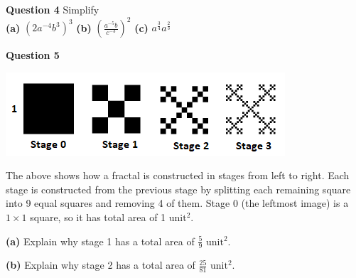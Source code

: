 \documentclass{article}
\begin{document}
{\Large \textbf{Question 4} Simplify \\[6pt]
\textbf{(a)} {\Large $(2a^{-4}b^3)^3$} \hfill \textbf{(b)} {\huge $\left ( \frac{a^{-5}b}{c^{-3}} \right )^2$} \hfill \textbf{(c)} {\huge $a^{\frac{3}{4}}a^{\frac{2}{3}}$}} 

\vspace{0.1cm}
\begin{center}
\end{center}


\pagebreak
{\Large \textbf{Question 5} \\[-6pt]

\begin{center}
\includegraphics{./fractal.png}
\end{center}

The above shows how a fractal is constructed  in stages from left to right. Each stage is constructed from the previous stage by splitting each remaining square into 9 equal squares and removing 4 of them. Stage 0 (the leftmost image) is a $1 \times 1$ square, so it has total area of 1 $\text{unit}^2$.
\vspace{0.4cm}

\textbf{(a)} Explain why stage 1 has a total area of {\huge $\frac{5}{9}$} $\text{unit}^2$.

\vspace{0.4cm}
\begin{center}
\end{center}
\vspace{0.2cm}

\textbf{(b)} Explain why stage 2 has a total area of {\huge $\frac{25}{81}$} $\text{unit}^2$.

}
\end{document}
